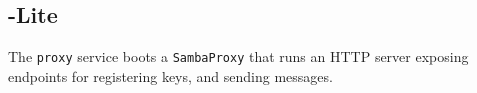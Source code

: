 
%
\subsection{\SystemName-Lite}

The \texttt{proxy} service boots a \texttt{SambaProxy} that runs an HTTP server exposing endpoints for registering keys, and sending messages. 

